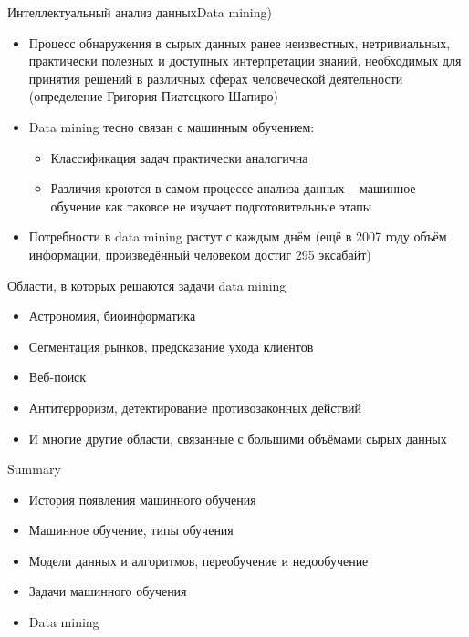 \documentclass[compress,red,unicode]{beamer}
\begin{document}
\begin{frame}{Интеллектуальный анализ данных}{Data mining)}
\begin{itemize}
\item Процесс обнаружения в сырых данных ранее неизвестных, нетривиальных, практически полезных и доступных интерпретации знаний, необходимых для принятия решений в различных сферах человеческой деятельности (определение Григория Пиатецкого-Шапиро)
\item Data mining тесно связан с машинным обучением:
\begin{itemize}
	\item Классификация задач практически аналогична
	\item Различия кроются в самом процессе анализа данных -- машинное обучение как таковое не изучает подготовительные этапы
\end{itemize}
\item Потребности в data mining растут с каждым днём (ещё в 2007 году объём информации, произведённый человеком достиг 295 эксабайт)
\end{itemize}
\end{frame}

\begin{frame}{Области, в которых решаются задачи  data mining}
\begin{itemize}
	\item Астрономия, биоинформатика
	\item Сегментация рынков, предсказание ухода клиентов
	\item Веб-поиск
	\item Антитерроризм, детектирование противозаконных действий 
	\item И многие другие области, связанные с большими объёмами сырых данных
\end{itemize}
\end{frame}

\begin{frame}{Summary}
\begin{itemize}
	\item История появления машинного обучения
	\item Машинное обучение, типы обучения
	\item Модели данных и алгоритмов, переобучение и недообучение
	\item Задачи машинного обучения 
	\item Data mining
\end{itemize}
\end{frame}
\end{document}
